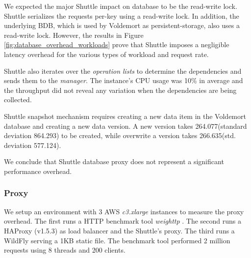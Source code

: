 We expected the major Shuttle impact on database to be the read-write lock. Shuttle serializes the requests per-key using a read-write lock. In addition, the underlying \acf{BDB}, which is used by Voldemort as persistent-storage, also uses a read-write lock. However, the results in Figure \ref{fig:database_overhead_workloads} prove that Shuttle imposes a negligible latency overhead for the various types of workload and request rate.  

Shuttle also iterates over the \emph{operation lists} to determine the dependencies and sends them to the \emph{manager}. The instance's CPU usage was 10\% in average and the throughput did not reveal any variation when the dependencies are being collected. 

Shuttle snapshot mechanism requires creating a new data item in the Voldemort database and creating a new data version. A new version takes 264.077\us (standard deviation 864.293\us) to be created, while overwrite a version takes 266.635\us (std. deviation 577.124\us).

We conclude that Shuttle database proxy does not represent a significant performance overhead. %


\subsubsection{Proxy}\label{sec:eval:performance:proxy}
We setup an environment with 3 \ac{AWS} \textit{c3.xlarge} instances to measure the proxy overhead. The first runs a \ac{HTTP} benchmark tool \emph{weighttp} \cite{weighttp}. The second runs a HAProxy (v1.5.3) as load balancer and the Shuttle's proxy. The third runs a WildFly serving a 1KB static file. The benchmark tool performed 2 million requests using 8 threads and 200 clients.

